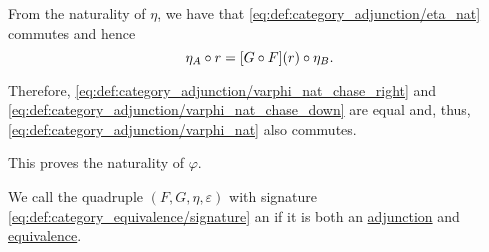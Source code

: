 \begin{defproof}
  From the naturality of \( \eta \), we have that \eqref{eq:def:category_adjunction/eta_nat} commutes and hence
  \begin{equation*}
    \eta_A \bincirc r
    =
    [G \bincirc F](r) \bincirc \eta_B.
  \end{equation*}

  Therefore, \eqref{eq:def:category_adjunction/varphi_nat_chase_right} and \eqref{eq:def:category_adjunction/varphi_nat_chase_down} are equal and, thus, \eqref{eq:def:category_adjunction/varphi_nat} also commutes.

  This proves the naturality of \( \varphi \).
\end{defproof}

\begin{definition}\label{def:adjoint_equivalence}
  We call the quadruple \( (F, G, \eta, \varepsilon) \) with signature \eqref{eq:def:category_equivalence/signature} an  if it is both an \hyperref[def:category_adjunction]{adjunction} and \hyperref[def:category_equivalence]{equivalence}.
\end{definition}

